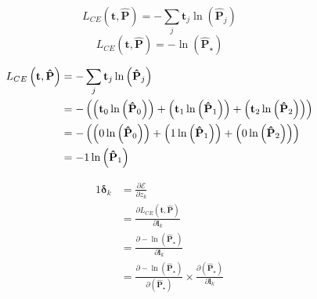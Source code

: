 \documentclass[xcolor={table}]{beamer}
\begin{document}
 \begin{frame} 
\begin{equation}
L_{CE}\left(\mathbf{t}, \mathbf{\hat{P}}\right) = - \sum_j \mathbf{t}_j \ln \left(\mathbf{\hat{P}}_j \right)
\label{eq:crossentropy}
\end{equation}
\begin{equation}
L_{CE}\left(\mathbf{t}, \mathbf{\hat{P}}\right) = - \ln \left(\mathbf{\hat{P}}_\star \right)
\label{eq:crossentropyonehot}
\end{equation}
\end{frame} 



 \begin{frame} 
\begin{alignat}{5}
L_{CE}\left(\mathbf{t}, \mathbf{\hat{P}}\right) & = - \sum_j \mathbf{t}_j \ln \left(\mathbf{\hat{P}} _j \right) \notag\\
~ & = - \left( \left( \mathbf{t}_0 \ln \left(\mathbf{\hat{P}} _0 \right) \right) +  \left( \mathbf{t}_1 \ln \left(\mathbf{\hat{P}} _1 \right) \right) + \left( \mathbf{t}_2 \ln \left(\mathbf{\hat{P}} _2 \right) \right) \right)\notag\\
~ & = - \left(  \left( 0 \ln \left(\mathbf{\hat{P}} _0 \right) \right) +  \left( 1 \ln \left(\mathbf{\hat{P}} _1 \right) \right) +  \left( 0 \ln \left(\mathbf{\hat{P}} _2 \right) \right) \right)\notag\\
~ & = -  1 \ln \left(\mathbf{\hat{P}} _1 \right) 
\label{eq:simplifiyingcrossentropy}
\end{alignat}
\end{frame} 



 \begin{frame} 
\begin{alignat}{1}
\boldsymbol{\delta}_k&= \frac{\partial \mathcal{E}}{\partial z_k} \label{eq:chainCEdefStep1}\\
~&= \frac{\partial L_{CE}\left(\mathbf{t}, \mathbf{\hat{P}}\right)}{\partial \mathbf{l}_k} \label{eq:chainCEdefStep2}\\
~&= \frac{\partial - \ln \left(\mathbf{\hat{P}}_\star \right) }{\partial \mathbf{l}_k} \label{eq:chainCEdefStep3}\\
~&= \frac{\partial - \ln \left(\mathbf{\hat{P}}_\star \right) }{\partial \left(\mathbf{\hat{P}}_\star \right)} \times \frac{\partial \left(\mathbf{\hat{P}}_\star \right)}{\partial \mathbf{l}_k} \label{eq:chainCEdefStep4}
\end{alignat}
\end{frame} 
\end{document}
